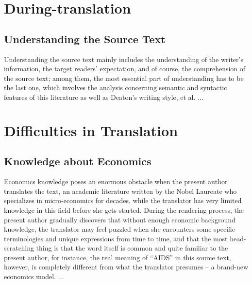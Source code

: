 \section{During-translation}
	\subsection{Understanding the Source Text}
	Understanding the source text mainly includes the understanding of the writer’s information, the target readers’ expectation, and of course, the comprehension of the source text; among them, the most essential part of understanding has to be the last one, which involves the analysis concerning semantic and syntactic features of this literature as well as Deaton’s writing style, et al. 
	...
	
\section{ Difficulties in Translation}
	\subsection{ Knowledge about Economics}
	Economics knowledge poses an enormous obstacle when the present author translates the text, an academic literature written by the Nobel Laureate who specializes in micro-economics for decades, while the translator has very limited knowledge in this field before she gets started. During the rendering process, the present author gradually discovers that without enough economic background knowledge, the translator may feel puzzled when she encounters some specific terminologies and unique expressions from time to time, and that the most head-scratching thing is that the word itself is common and quite familiar to the present author, for instance, the real meaning of “AIDS” in this source text, however, is completely different from what the translator presumes -- a brand-new economics model. 
	...